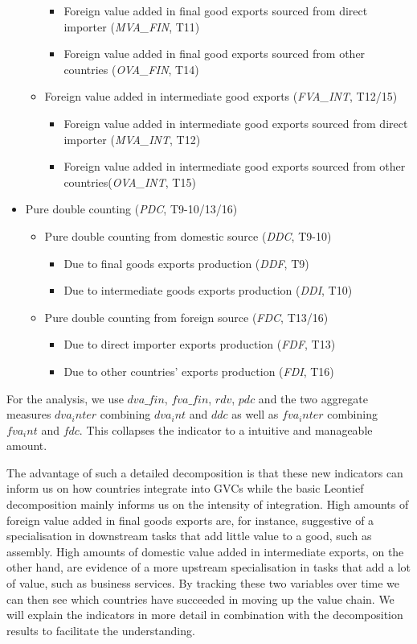 \documentclass[11pt,a4paper]{article}
\begin{document}
\begin{itemize}
\begin{itemize}
\begin{itemize}
\item Foreign value added in final good exports sourced from direct importer (\textit{MVA\_FIN}, T11)
\item Foreign value added in final good exports sourced from other countries (\textit{OVA\_FIN}, T14)
\end{itemize}
\item Foreign value added in intermediate good exports (\textit{FVA\_INT}, T12/15)
\begin{itemize}
\item Foreign value added in intermediate good exports sourced from direct importer (\textit{MVA\_INT}, T12)
\item Foreign value added in intermediate good exports sourced from other countries(\textit{OVA\_INT}, T15)
\end{itemize}
\end{itemize}
\item Pure double counting (\textit{PDC}, T9-10/13/16)
\begin{itemize}
\item Pure double counting from domestic source (\textit{DDC}, T9-10)
\begin{itemize}
\item Due to final goods exports production (\textit{DDF}, T9)
\item Due to intermediate goods exports production (\textit{DDI}, T10)
\end{itemize}
\item Pure double counting from foreign source (\textit{FDC}, T13/16)
\begin{itemize}
\item Due to direct importer exports production (\textit{FDF}, T13)
\item Due to other countries' exports production (\textit{FDI}, T16)
\end{itemize}
\end{itemize}
\end{itemize}

For the analysis, we use $dva\_fin$, $fva\_fin$, $rdv$, $pdc$ and the two aggregate measures $dva_inter$ combining $dva_int$ and $ddc$ as well as $fva_inter$ combining $fva_int$ and $fdc$. This collapses the indicator to a intuitive and manageable amount. 

The advantage of such a detailed decomposition is that these new indicators can inform us on how countries integrate into GVCs while the basic Leontief decomposition mainly informs us on the intensity of integration. High amounts of foreign value added in final goods exports are, for instance, suggestive of a specialisation in downstream tasks that add little value to a good, such as assembly. High amounts of domestic value added in intermediate exports, on the other hand, are evidence of a more upstream specialisation in tasks that add a lot of value, such as business services. By tracking these two variables over time we can then see which countries have succeeded in moving up the value chain. We will explain the indicators in more detail in combination with the decomposition results to facilitate the understanding.
\end{document}
